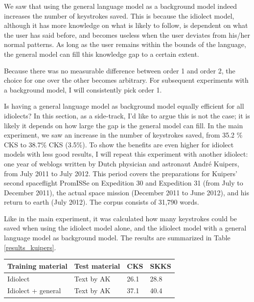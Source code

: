 \documentclass[11pt]{article}
\let\originaltable\table
\let\endoriginaltable\endtable
\renewenvironment{table}[1][ht]{%
  \originaltable[#1]
  \centering}%
  {\endoriginaltable}
\begin{document}
We saw that using the general language model as a background model indeed increases the number of keystrokes saved. This is because the idiolect model, although it has more knowledge on what is likely to follow, is dependent on what the user has said before, and becomes useless when the user deviates from his/her normal patterns. As long as the user remains within the bounds of the language, the general model can fill this knowledge gap to a certain extent.

Because there was no measurable difference between order 1 and order 2, the choice for one over the other becomes arbitrary. For subsequent experiments with a background model, I will consistently pick order 1.

Is having a general language model as background model equally efficient for all idiolects? In this section, as a side-track, I'd like to argue this is not the case; it is likely it depends on how large the gap is the general model can fill. In the main experiment, we saw an increase in the number of keystrokes saved, from 35.2 \% CKS to 38.7\% CKS (3.5\%). To show the benefits are even higher for idiolect models with less good results, I will repeat this experiment with another idiolect: one year of weblogs written by Dutch physician and astronaut Andr\'e Kuipers, from July 2011 to July 2012. This period covers the preparations for Kuipers' second spaceflight PromISSe on Expedition 30 and Expedition 31 (from July to December 2011), the actual space mission (December 2011 to June 2012), and his return to earth (July 2012). The corpus consists of 31,790 words. 

Like in the main experiment, it was calculated how many keystrokes could be saved when using the idiolect model alone, and the idiolect model with a general language model as background model. The results are summarized in Table \ref{results_kuipers}. 

\begin{table}[H]
\begin{tabular}{ll|ll} 
Training material&Test material&CKS&SKKS\\
\hline
Idiolect&Text by AK&26.1&28.8\\
Idiolect + general&Text by AK&37.1&40.4\\
\end{tabular} 
\caption{Percentage of keystrokes that can be saved when using the idiolect of Andr\'e Kuipers, with and without background model} \label{results_kuipers}
\end{table}
\end{document}
